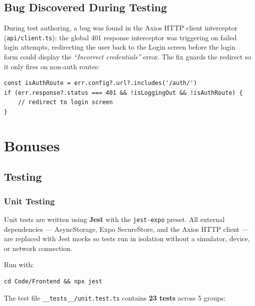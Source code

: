 \documentclass[12pt,a4paper]{article}
\begin{document}
\subsection{Bug Discovered During Testing}

During test authoring, a bug was found in the Axios HTTP client interceptor (\texttt{api/client.ts}): the global 401 response interceptor was triggering on failed login attempts, redirecting the user back to the Login screen before the login form could display the \textit{``Incorrect credentials''} error. The fix guards the redirect so it only fires on non-auth routes:

\begin{verbatim}
const isAuthRoute = err.config?.url?.includes('/auth/')
if (err.response?.status === 401 && !isLoggingOut && !isAuthRoute) {
    // redirect to login screen
}
\end{verbatim}

\section{Bonuses}

\subsection{Testing}

\subsubsection{Unit Testing}

Unit tests are written using \textbf{Jest} with the \texttt{jest-expo} preset. All external dependencies --- AsyncStorage, Expo SecureStore, and the Axios HTTP client --- are replaced with Jest mocks so tests run in isolation without a simulator, device, or network connection.

Run with:
\begin{verbatim}
cd Code/Frontend && npx jest
\end{verbatim}

The test file \texttt{\_\_tests\_\_/unit.test.ts} contains \textbf{23 tests} across 5 groups:
\end{document}
